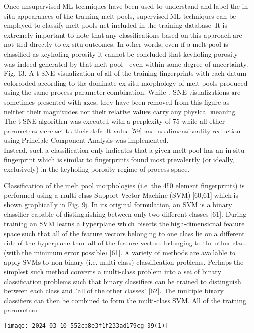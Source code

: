 \documentclass[10pt]{article}
\begin{document}
Once unsupervised ML techniques have been used to understand and label the in-situ appearances of the training melt pools, supervised ML techniques can be employed to classify melt pools not included in the training database. It is extremely important to note that any classifications based on this approach are not tied directly to ex-situ outcomes. In other words, even if a melt pool is classified as keyholing porosity it cannot be concluded that keyholing porosity was indeed generated by that melt pool - even within some degree of uncertainty.\\
Fig. 13. A t-SNE visualization of all of the training fingerprints with each datum colorcoded according to the dominate ex-situ morphology of melt pools produced using the same process parameter combination. While t-SNE visualizations are sometimes presented with axes, they have been removed from this figure as neither their magnitudes nor their relative values carry any physical meaning. The t-SNE algorithm was executed with a perplexity of 75 while all other parameters were set to their default value [59] and no dimensionality reduction using Principle Component Analysis was implemented.\\
Instead, such a classification only indicates that a given melt pool has an in-situ fingerprint which is similar to fingerprints found most prevalently (or ideally, exclusively) in the keyholing porosity regime of process space.

Classification of the melt pool morphologies (i.e. the 450 element fingerprints) is performed using a multi-class Support Vector Machine (SVM) [60,61] which is shown graphically in Fig. 9j. In its original formulation, an SVM is a binary classifier capable of distinguishing between only two different classes [61]. During training an SVM learns a hyperplane which bisects the high-dimensional feature space such that all of the feature vectors belonging to one class lie on a different side of the hyperplane than all of the feature vectors belonging to the other class (with the minimum error possible) [61]. A variety of methods are available to apply SVMs to non-binary (i.e. multi-class) classification problems. Perhaps the simplest such method converts a multi-class problem into a set of binary classification problems such that binary classifiers can be trained to distinguish between each class and "all of the other classes" [62]. The multiple binary classifiers can then be combined to form the multi-class SVM. All of the training parameters

\begin{center}
\texttt{[image: 2024\_03\_10\_552cb8e3f1f233ad179cg-09(1)]}
\end{center}
\end{document}
